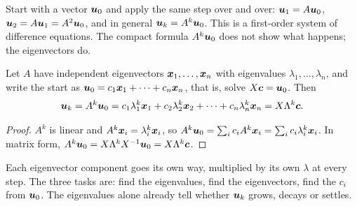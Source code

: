 Start with a vector $\boldsymbol{u}_0$ and apply the same step over and over:
$\boldsymbol{u}_1=A\boldsymbol{u}_0$, $\boldsymbol{u}_2=A\boldsymbol{u}_1=A^{2}\boldsymbol{u}_0$, and in general
$\boldsymbol{u}_k=A^{k}\boldsymbol{u}_0$. This is a first-order system of difference equations. The compact
formula $A^{k}\boldsymbol{u}_0$ does not show what happens; the eigenvectors do.

\begin{proposition}\label{prop:u24-difference}
Let $A$ have independent eigenvectors $\boldsymbol{x}_1,\dots,\boldsymbol{x}_n$ with eigenvalues
$\lambda_1,\dots,\lambda_n$, and write the start as $\boldsymbol{u}_0=c_1\boldsymbol{x}_1+\dots+c_n\boldsymbol{x}_n$,
that is, solve $X\boldsymbol{c}=\boldsymbol{u}_0$. Then
\[
  \boldsymbol{u}_k=A^{k}\boldsymbol{u}_0=c_1\lambda_1^{k}\boldsymbol{x}_1+c_2\lambda_2^{k}\boldsymbol{x}_2+\dots+c_n\lambda_n^{k}\boldsymbol{x}_n
  =X\Lambda^{k}\boldsymbol{c}.
\]
\end{proposition}

\begin{proof}
$A^{k}$ is linear and $A^{k}\boldsymbol{x}_i=\lambda_i^{k}\boldsymbol{x}_i$, so
$A^{k}\boldsymbol{u}_0=\sum_i c_iA^{k}\boldsymbol{x}_i=\sum_i c_i\lambda_i^{k}\boldsymbol{x}_i$. In matrix form,
$A^{k}\boldsymbol{u}_0=X\Lambda^{k}X^{-1}\boldsymbol{u}_0=X\Lambda^{k}\boldsymbol{c}$.
\end{proof}

Each eigenvector component goes its own way, multiplied by its own $\lambda$ at every step.
The three tasks are: find the eigenvalues, find the eigenvectors, find the $c_i$ from
$\boldsymbol{u}_0$. The eigenvalues alone already tell whether $\boldsymbol{u}_k$ grows, decays or settles.

